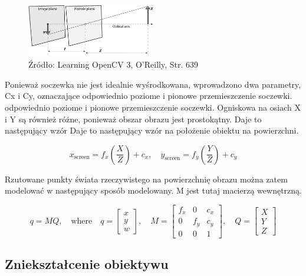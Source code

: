 \documentclass[magisterska]{pracadypl}
\begin{document}
\begin{figure}[h]  %
    \centering  %
    \includegraphics[width=0.5\textwidth]{images/pinhole.png}  %
    \captionsetup{labelformat=empty, font=footnotesize}
    \caption{Źródło: Learning OpenCV 3, O'Reilly, Str. 639}
    \label{fig:rpi}  %
\end{figure}

Ponieważ soczewka nie jest idealnie wyśrodkowana, wprowadzono dwa parametry, Cx i Cy, oznaczające odpowiednio poziome i pionowe przemieszczenie soczewki.
odpowiednio poziome i pionowe przemieszczenie soczewki. Ogniskowa na osiach X i
Y są również różne, ponieważ obszar obrazu jest prostokątny. Daje to następujący wzór
Daje to następujący wzór na położenie obiektu na powierzchni.

\[
x_{\text{screen}} = f_x \left( \frac{X}{Z} \right) + c_x, \quad
y_{\text{screen}} = f_y \left( \frac{Y}{Z} \right) + c_y
\]

Rzutowane punkty świata rzeczywistego na powierzchnię obrazu można zatem modelować w następujący sposób
modelowany. M jest tutaj macierzą wewnętrzną.

\[
q = MQ, \quad \text{where} \quad
q = \begin{bmatrix} x \\ y \\ w \end{bmatrix}, \quad
M = \begin{bmatrix}
f_x & 0 & c_x \\
0 & f_y & c_y \\
0 & 0 & 1
\end{bmatrix}, \quad
Q = \begin{bmatrix} X \\ Y \\ Z \end{bmatrix}
\]

\subsection{Zniekształcenie obiektywu}
\end{document}
